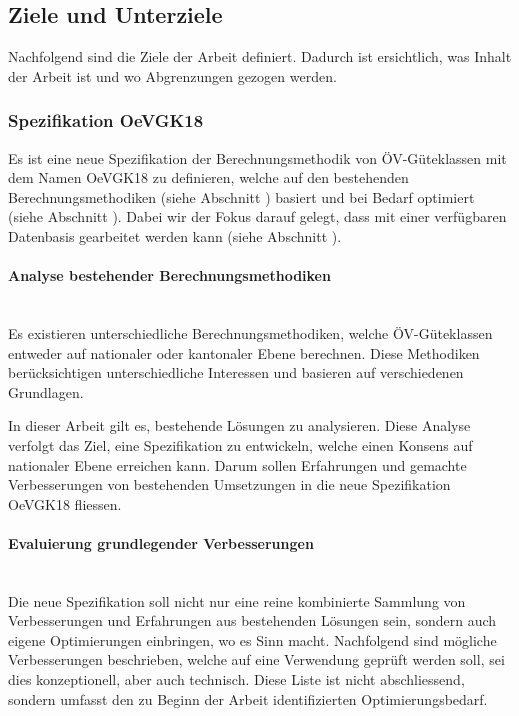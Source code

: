 \subsection{Ziele und Unterziele}
\label{Einführung:Ziele und Unterziele}

Nachfolgend sind die Ziele der Arbeit definiert.
Dadurch ist ersichtlich, was Inhalt der Arbeit ist und wo Abgrenzungen gezogen werden.

\subsubsection{Spezifikation OeVGK18}
\label{Ziele und Unterziele:Spezifikation OeVGK18}

Es ist eine neue Spezifikation der Berechnungsmethodik von \acs{ÖV}-Güteklassen mit dem Namen \gls{OeVGK18} zu definieren, welche auf den bestehenden Berechnungsmethodiken (siehe Abschnitt \emph{}) basiert und bei Bedarf optimiert (siehe Abschnitt \emph{}).
Dabei wir der Fokus darauf gelegt, dass mit einer verfügbaren Datenbasis gearbeitet werden kann (siehe Abschnitt \emph{}).

\paragraph{Analyse bestehender Berechnungsmethodiken}~\\
\label{Spezifikation OeVGK18:Analyse bestehender Berechnungsmethodiken}
Es existieren unterschiedliche Berechnungsmethodiken, welche \acs{ÖV}-Güteklassen entweder auf nationaler oder kantonaler Ebene berechnen.
Diese Methodiken berücksichtigen unterschiedliche Interessen und basieren auf verschiedenen Grundlagen.

In dieser Arbeit gilt es, bestehende Lösungen zu analysieren.
Diese Analyse verfolgt das Ziel, eine Spezifikation zu entwickeln, welche einen Konsens auf nationaler Ebene erreichen kann.
Darum sollen Erfahrungen und gemachte Verbesserungen von bestehenden Umsetzungen in die neue Spezifikation \gls{OeVGK18} fliessen.

\paragraph{Evaluierung grundlegender Verbesserungen}~\\
\label{Spezifikation OeVGK18:Evaluierung grundlegender Verbesserungen}
Die neue Spezifikation soll nicht nur eine reine kombinierte Sammlung von Verbesserungen und Erfahrungen aus bestehenden Lösungen sein, sondern auch eigene Optimierungen einbringen, wo es Sinn macht.
Nachfolgend sind mögliche Verbesserungen beschrieben, welche auf eine Verwendung geprüft werden soll, sei dies konzeptionell, aber auch technisch.
Diese Liste ist nicht abschliessend, sondern umfasst den zu Beginn der Arbeit identifizierten Optimierungsbedarf.

